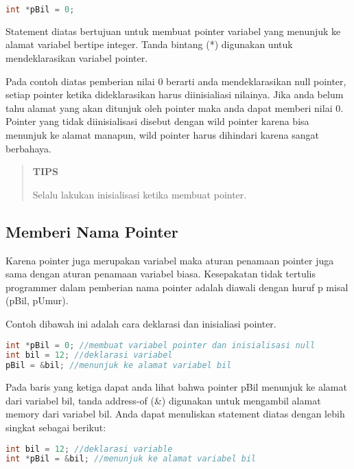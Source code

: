 \begin{lstlisting}[language=c++]
int *pBil = 0;
\end{lstlisting}

Statement diatas bertujuan untuk membuat pointer variabel yang menunjuk
ke alamat variabel bertipe integer. Tanda bintang (*) digunakan untuk
mendeklarasikan variabel pointer.

Pada contoh diatas pemberian nilai 0 berarti anda mendeklarasikan null
pointer, setiap pointer ketika dideklarasikan harus diinisialiasi
nilainya. Jika anda belum tahu alamat yang akan ditunjuk oleh pointer
maka anda dapat memberi nilai 0. Pointer yang tidak diinisialisasi
disebut dengan wild pointer karena bisa menunjuk ke alamat manapun, wild
pointer harus dihindari karena sangat berbahaya.

\begin{quotation}
	 \textbf{TIPS} 
	 
	 Selalu
	 lakukan inisialisasi ketika membuat pointer.
\end{quotation}


\subsection{Memberi Nama Pointer}\label{memberi-nama-pointer}

Karena pointer juga merupakan variabel maka aturan penamaan pointer juga
sama dengan aturan penamaan variabel biasa. Kesepakatan tidak tertulis
programmer dalam pemberian nama pointer adalah diawali dengan huruf p
misal (pBil, pUmur).

Contoh dibawah ini adalah cara deklarasi dan inisialiasi pointer.

\begin{lstlisting}[language=c++]
int *pBil = 0; //membuat variabel pointer dan inisialisasi null
int bil = 12; //deklarasi variabel
pBil = &bil; //menunjuk ke alamat variabel bil
\end{lstlisting}

Pada baris yang ketiga dapat anda lihat bahwa pointer pBil menunjuk ke
alamat dari variabel bil, tanda address-of (\&) digunakan untuk
mengambil alamat memory dari variabel bil. Anda dapat menuliskan
statement diatas dengan lebih singkat sebagai berikut:

\begin{lstlisting}[language=c++]
int bil = 12; //deklarasi variable
int *pBil = &bil; //menunjuk ke alamat variabel bil
\end{lstlisting}

